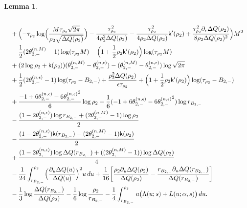 \documentclass[a4paper]{article}
\newtheorem{lemma}[theorem]{Lemma}
\numberwithin{equation}{section}
\begin{document}
\begin{lemma}
\begin{align*}
\\
&\quad
+
\Bigl( 
-\tau_{\rho_2}\log\Bigl(\frac{M\tau_{\rho_2}\sqrt{2\pi}}{\rho_2\sqrt{\Delta Q(\rho_2)}}\Bigr)
-\frac{\tau_{\rho_2}^2}{4\rho_2^2\Delta Q(\rho_2)}
-\frac{\tau_{\rho_2}^2}{4\rho_2\Delta Q(\rho_2)}\mathsf{k}'(\rho_2)
+\frac{\tau_{\rho_2}^2\partial_r\Delta Q(\rho_2)}{8\rho_2\Delta Q(\rho_2)^2}
\Bigr)M^2
\\
&\quad
-\frac{1}{2}(2\theta_{2,-}^{(n,M)}-1)\log(\tau_{\rho_2}M)
-\Bigl(1+\frac{1}{2}\rho_2\mathsf{k}'(\rho_2)\Bigr)\log(\tau_{\rho_2}M)
\\
&\quad
+(2\log\rho_2+\mathsf{k}(\rho_2))(\theta_{2,-}^{(n,M)}-\theta_{2,-}^{(n,\epsilon)})
   -(\theta_{2,-}^{(n,M)}-\theta_{2,-}^{(n,\epsilon)})\log\sqrt{2\pi}
\\
&\quad
+\frac{1}{2}(2\theta_{2,-}^{(n,\epsilon)}-1)\log(\tau_{\rho_2}-B_{2,-})
+\frac{\rho_2^2\Delta Q(\rho_2)}{\epsilon\tau_{\rho_2}}
+\Bigl(1+\frac{1}{2}\rho_2\mathsf{k}'(\rho_2)\Bigr)\log(\tau_{\rho_2}-B_{2,-})
    \\
&\quad
 +
\frac{-1+6\theta_{2,-}^{(n,\epsilon)}-6{\theta_{2,-}^{(n,\epsilon)}}^2}{6}\log\rho_2
-\frac{1}{6}
(-1+6\theta_{2,-}^{(n,\epsilon)}-6{\theta_{2,-}^{(n,\epsilon)}}^2)
\log r_{B_{2,-}}
\\
&\quad
-\frac{(1-2\theta_{2,-}^{(n,\epsilon)})\log r_{B_{2,-}}+(2\theta_{2,-}^{(n,M)}-1)\log \rho_2}{2}
\\
&\quad
-\frac{(1-2\theta_{2,-}^{(n,\epsilon)})\mathsf{k}(r_{B_{2,-}})+(2\theta_{2,-}^{(n,M)}-1)\mathsf{k}(\rho_2)}{2}
\\
&\quad
+\frac{(1-2\theta_{2,-}^{(n,\epsilon)})\log\Delta Q(r_{B_{2,-}})+((2\theta_{2,-}^{(n,M)}-1))\log\Delta Q(\rho_2)}{4}
\\
&\quad
-\frac{1}{24}\int_{r_{B_{2,-}}}^{\rho_2}\Bigl(\frac{\partial_u \Delta Q(u)}{\Delta Q(u)}\Bigr)^2u\,du
+\frac{1}{16}\bigg[
\frac{\rho_2\partial_u\Delta Q(\rho_2)}{\Delta Q(\rho_2)}-\frac{r_{B_{2,-}}\partial_u\Delta Q(r_{B_{2,-}})}{\Delta Q(r_{B_{2,-}})}
\bigg]\\
&\quad -\frac{1}{3}\log\frac{\Delta Q(r_{B_{2,-}})}{\Delta Q(\rho_2)}
-\frac{1}{6}\log\frac{\rho_2}{r_{B_{2,-}}}
-\frac{1}{4}\int_{r_{B_{2,-}}}^{\rho_2}u\bigl( \Lambda(u;s)+L(u;\alpha,s)\bigr)\,du.  
\end{align*}
\end{lemma}
\end{document}
